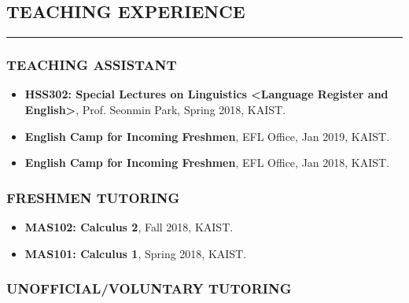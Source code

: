 \documentclass[10pt,a4]{article}
\newcounter{mySaveCounter}
\newcommand\myEnumReset{\setcounter{mySaveCounter}{0}}
\begin{document}
\begin{small}



\subsection*{TEACHING EXPERIENCE}
\hrule
\vspace{0.2cm}

\subsubsection*{TEACHING ASSISTANT}
\begin{itemize}


\item {\bf HSS302: Special Lectures on Linguistics \textless Language Register and English\textgreater}, Prof. Seonmin Park, Spring 2018, KAIST.

\item {\bf English Camp for Incoming Freshmen}, EFL Office, Jan 2019, KAIST.

\item {\bf English Camp for Incoming Freshmen}, EFL Office, Jan 2018, KAIST.

\end{itemize}

\subsubsection*{FRESHMEN TUTORING}
\begin{itemize}

\item {\bf MAS102: Calculus 2}, Fall 2018, KAIST.

\item {\bf MAS101: Calculus 1}, Spring 2018, KAIST.

\end{itemize}

\subsubsection*{UNOFFICIAL/VOLUNTARY TUTORING}
\begin{itemize}


\end{itemize}
\end{small}
\end{document}

